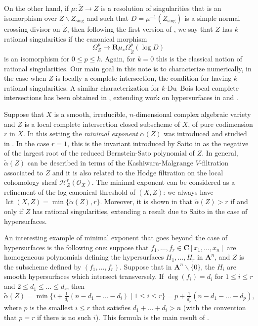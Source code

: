 \documentclass[JEP,XML,SOM,Unicode]{cedram}
\theoremstyle{plain}
\theoremstyle{definition}
\newcommand\cH{\mathcal{H}}
\newcommand\cO{\mathcal{O}}
\newcommand\cH{\mathcal{H}}
\newcommand\cO{\mathcal{O}}
\newcommand\sing{\mathrm{sing}}
\DeclareMathOperator{\lct}{lct}
\begin{document}
On the other hand, if $\mu\colon\widetilde{Z}\to Z$ is a resolution of singularities that is an isomorphism over $Z\smallsetminus Z_\sing$
and such that $D=\mu^{-1}(Z_\sing)$ is a simple normal crossing divisor on $\widetilde{Z}$, then following the first version of \cite{FL1}, we say that $Z$ has
$k$-rational singularities if the canonical morphism
\[\Omega_Z^p\to {\mathbf R}\mu_*\Omega_{\widetilde{Z}}^p(\log D)\]
is an isomorphism for $0\leq p\leq k$. Again, for $k=0$ this is the classical notion of rational singularities.
Our main goal in this note is to characterize numerically, in the case when $Z$ is locally a complete intersection, the condition for having $k$-rational singularities.
A similar characterization for $k$-Du~Bois local complete intersections has been obtained in \cite{MP1}, extending work on hypersurfaces in \cite{MOPW}
and \cite{Saito_et_al}.

Suppose that $X$ is a smooth, irreducible, $n$-dimensional complex algebraic variety and $Z$ is a local complete intersection closed subscheme of $X$,
of pure codimension $r$ in $X$. In this setting the \emph{minimal exponent} $\widetilde{\alpha}(Z)$ was introduced and studied in \cite{CDMO}. In the case
$r=1$, this is the invariant introduced by Saito in \cite{Saito_microlocal} as the negative of the largest root of the reduced Bernstein-Sato polynomial of $Z$.
In general, $\widetilde{\alpha}(Z)$ can be described in terms of the Kashiwara-Malgrange $V$-filtration associated to $Z$ and it is also related to the Hodge filtration on the
local cohomology sheaf $\cH_Z^r(\cO_X)$. The minimal exponent can be considered as a refinement of the log canonical threshold of $(X,Z)$: we always have
$\lct(X,Z)=\min\big\{\widetilde{\alpha}(Z),r\}$. Moreover, it is shown in \cite{CDMO} that $\widetilde{\alpha}(Z)>r$ if and only if $Z$ has rational singularities,
extending a result due to Saito \cite{Saito-B} in the case of hypersurfaces.

An interesting example of minimal exponent that goes beyond the case of hypersurfaces is the following one: suppose that $f_1,\ldots,f_r\in {\mathbf C}[x_1,\ldots,x_n]$
are homogeneous polynomials defining the hypersurfaces $H_1,\ldots,H_r$ in ${\mathbf A}^n$, and $Z$ is the subscheme defined by $(f_1,\ldots,f_r)$.
Suppose that in ${\mathbf A}^n\smallsetminus\{0\}$, the $H_i$ are smooth hypersurfaces which
intersect transversely. If $\deg(f_i)=d_i$ for $1\leq i\leq r$ and $2\leq d_1\leq\ldots\leq d_r$, then
\[\widetilde{\alpha}(Z)=\min\big\{i+\tfrac{1}{d_i}(n-d_1-\ldots-d_i)\mid 1\leq i\leq r\big\}=p+\tfrac{1}{d_p}(n-d_1-\ldots-d_p),\]
where $p$ is the smallest $i\leq r$ that satisfies $d_1+\ldots+d_i>n$ (with the convention that $p=r$ if there is no such $i$). This formula is the main result of \cite{CDM}.
\end{document}
